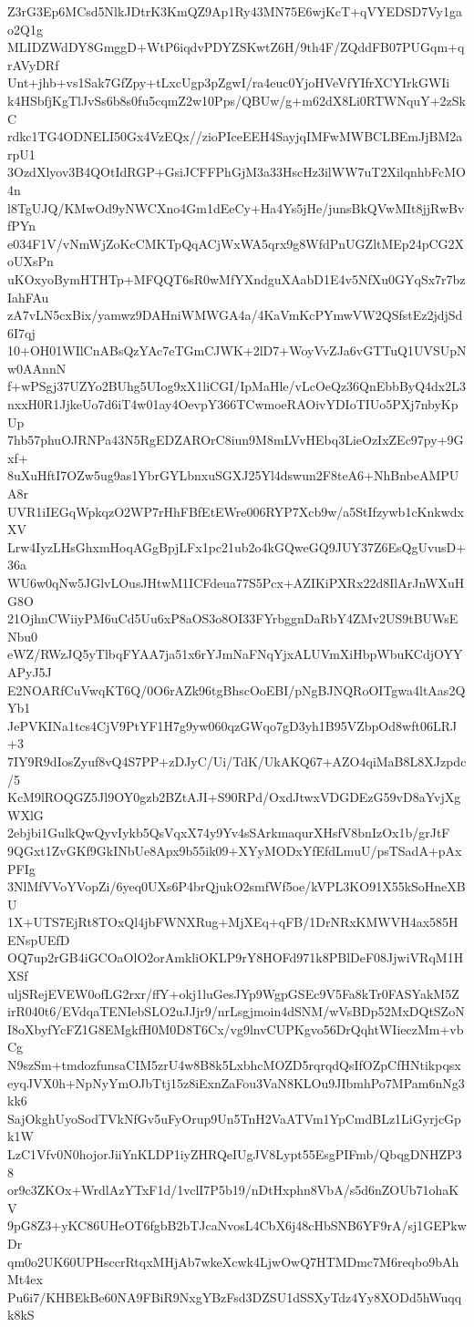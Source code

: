 Z3rG3Ep6MCsd5NlkJDtrK3KmQZ9Ap1Ry43MN75E6wjKcT+qVYEDSD7Vy1gao2Q1g
MLIDZWdDY8GmggD+WtP6iqdvPDYZSKwtZ6H/9th4F/ZQddFB07PUGqm+qrAVyDRf
Unt+jhb+vs1Sak7GfZpy+tLxcUgp3pZgwI/ra4euc0YjoHVeVfYIfrXCYIrkGWIi
k4HSbfjKgTlJvSs6b8s0fu5cqmZ2w10Pps/QBUw/g+m62dX8Li0RTWNquY+2zSkC
rdkc1TG4ODNELI50Gx4VzEQx//zioPIceEEH4SayjqIMFwMWBCLBEmJjBM2arpU1
3OzdXlyov3B4QOtIdRGP+GsiJCFFPhGjM3a33HscHz3ilWW7uT2XilqnhbFcMO4n
l8TgUJQ/KMwOd9yNWCXno4Gm1dEeCy+Ha4Ys5jHe/junsBkQVwMIt8jjRwBvfPYn
e034F1V/vNmWjZoKcCMKTpQqACjWxWA5qrx9g8WfdPnUGZltMEp24pCG2XoUXsPn
uKOxyoBymHTHTp+MFQQT6sR0wMfYXndguXAabD1E4v5NfXu0GYqSx7r7bzIahFAu
zA7vLN5cxBix/yamwz9DAHniWMWGA4a/4KaVmKcPYmwVW2QSfstEz2jdjSd6I7qj
10+OH01WIlCnABsQzYAc7eTGmCJWK+2lD7+WoyVvZJa6vGTTuQ1UVSUpNw0AAnnN
f+wPSgj37UZYo2BUhg5UIog9xX1liCGI/IpMaHle/vLcOeQz36QnEbbByQ4dx2L3
nxxH0R1JjkeUo7d6iT4w01ay4OevpY366TCwmoeRAOivYDIoTIUo5PXj7nbyKpUp
7hb57phuOJRNPa43N5RgEDZAROrC8iun9M8mLVvHEbq3LieOzIxZEc97py+9Gxf+
8uXuHftI7OZw5ug9as1YbrGYLbnxuSGXJ25Yl4dswun2F8teA6+NhBnbeAMPUA8r
UVR1iIEGqWpkqzO2WP7rHhFBfEtEWre006RYP7Xcb9w/a5StIfzywb1cKnkwdxXV
Lrw4IyzLHsGhxmHoqAGgBpjLFx1pc21ub2o4kGQweGQ9JUY37Z6EsQgUvusD+36a
WU6w0qNw5JGlvLOusJHtwM1ICFdeua77S5Pcx+AZIKiPXRx22d8IlArJnWXuHG8O
21OjhnCWiiyPM6uCd5Uu6xP8aOS3o8OI33FYrbggnDaRbY4ZMv2US9tBUWsENbu0
eWZ/RWzJQ5yTlbqFYAA7ja51x6rYJmNaFNqYjxALUVmXiHbpWbuKCdjOYYAPyJ5J
E2NOARfCuVwqKT6Q/0O6rAZk96tgBhscOoEBI/pNgBJNQRoOITgwa4ltAas2QYb1
JePVKINa1tcs4CjV9PtYF1H7g9yw060qzGWqo7gD3yh1B95VZbpOd8wft06LRJ+3
7IY9R9dIosZyuf8vQ4S7PP+zDJyC/Ui/TdK/UkAKQ67+AZO4qiMaB8L8XJzpdc/5
KcM9lROQGZ5Jl9OY0gzb2BZtAJI+S90RPd/OxdJtwxVDGDEzG59vD8aYvjXgWXlG
2ebjbi1GulkQwQyvIykb5QsVqxX74y9Yv4sSArkmaqurXHsfV8bnIzOx1b/grJtF
9QGxt1ZvGKf9GkINbUe8Apx9b55ik09+XYyMODxYfEfdLmuU/psTSadA+pAxPFIg
3NlMfVVoYVopZi/6yeq0UXs6P4brQjukO2smfWf5oe/kVPL3KO91X55kSoHneXBU
1X+UTS7EjRt8TOxQl4jbFWNXRug+MjXEq+qFB/1DrNRxKMWVH4ax585HENspUEfD
OQ7up2rGB4iGCOaOlO2orAmkliOKLP9rY8HOFd971k8PBlDeF08JjwiVRqM1HXSf
uljSRejEVEW0ofLG2rxr/ffY+okj1luGesJYp9WgpGSEc9V5Fa8kTr0FASYakM5Z
irR040t6/EVdqaTENIebSLO2uJJjr9/nrLsgjmoin4dSNM/wVsBDp52MxDQtSZoN
I8oXbyfYcFZ1G8EMgkfH0M0D8T6Cx/vg9lnvCUPKgvo56DrQqhtWIieczMm+vbCg
N9szSm+tmdozfunsaCIM5zrU4w8B8k5LxbhcMOZD5rqrqdQsIfOZpCfHNtikpqsx
eyqJVX0h+NpNyYmOJbTtj15z8iExnZaFou3VaN8KLOu9JIbmhPo7MPam6nNg3kk6
SajOkghUyoSodTVkNfGv5uFyOrup9Un5TnH2VaATVm1YpCmdBLz1LiGyrjcGpk1W
LzC1Vfv0N0hojorJiiYnKLDP1iyZHRQeIUgJV8Lypt55EsgPIFmb/QbqgDNHZP38
or9c3ZKOx+WrdlAzYTxF1d/1vclI7P5b19/nDtHxphn8VbA/s5d6nZOUb71ohaKV
9pG8Z3+yKC86UHeOT6fgbB2bTJcaNvosL4CbX6j48cHbSNB6YF9rA/sj1GEPkwDr
qm0o2UK60UPHsccrRtqxMHjAb7wkeXcwk4LjwOwQ7HTMDmc7M6reqbo9bAhMt4ex
Pu6i7/KHBEkBe60NA9FBiR9NxgYBzFsd3DZSU1dSSXyTdz4Yy8XODd5hWuqqk8kS
